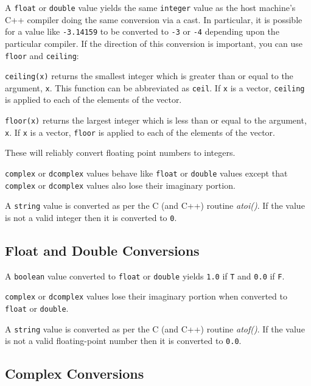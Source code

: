 A {\tt float} or {\tt double} value yields the same {\tt integer} value
as the host machine's C++ compiler doing the same conversion
via a cast.  In particular, it is possible for a value like {\tt -3.14159} to
be converted to {\tt -3} or {\tt -4} depending upon the particular compiler. If
the direction of  this conversion is important, you can use
{\tt floor} and {\tt ceiling}:
\begin{list}{}{}

\item[{\tt ceiling(x)}]
\label{ceiling-func}
returns the smallest integer which is greater than or equal to the
argument, {\tt x}. This function can be abbreviated as {\tt ceil}. If
{\tt x} is a vector, {\tt ceiling} is applied to each of the elements
of the vector.

\item[{\tt floor(x)}]
\label{floor-func}
returns the largest integer which is less than or equal to the
argument, {\tt x}. If {\tt x} is a vector, {\tt floor} is applied to
each of the elements of the vector.

\end{list}
These will reliably convert floating point numbers to integers.

{\tt complex} or {\tt dcomplex} values behave like {\tt float} or
{\tt double} values except that {\tt complex} or {\tt dcomplex} values
also lose their imaginary portion.

A {\tt string} value is converted as per the C (and C++)
routine {\em atoi()}.
If the value is not a valid integer then it is converted to {\tt 0}.

\subsection{Float and Double Conversions}

A {\tt boolean} value converted to {\tt float} or {\tt double} yields
{\tt 1.0} if {\tt T} and {\tt 0.0} if {\tt F}.

{\tt complex} or {\tt dcomplex} values lose their imaginary portion
when converted to {\tt float} or {\tt double}.

A {\tt string} value is converted as per the C (and C++)
routine {\em atof()}.
If the value is not a valid floating-point number then it is converted
to {\tt 0.0}.

\subsection{Complex Conversions}


